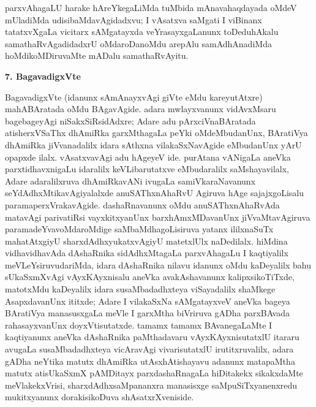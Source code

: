parxvAha\-gaLU harake hAreYkegaLiMda tuMbida mAnavahaqdayada oMdeV mUladiMda udisi\-baMdavAgidadxvu; I vAsatxva saMgati I viBinanx tatatxvXgaLa vicitarx sAMgatayxda veYrasayx\-gaLanunx toDeduhAkalu samathaRvAgadidadxrU oMdaroDanoMdu arepAlu samAdhAnadiMda hoMdikoMDiruvaMte mADalu samathaRvAyitu.

\smallskip
\begin{center}
{\Large\bf 7. BagavadigxVte}
\end{center}

BagavadigxVte (idanunx sAmAnayxvAgi giVte eMdu kareyutAtxre) mahABAratada oMdu BAgavAgide. adara mwlayxvanunx vidAvxMsaru bagebageyAgi niSakxSiRsidAdxre; Adare adu pArxciVnaBAratada atisherxVSaThx dhAmiRka garxMthagaLa peYki oMdeMbudanUnx, BAratiVya dhAmiRka jiVvanadalilx idara sAthxna vilakaSxNavAgide eMbudanUnx yArU opapxde ilalx. vAsatxvavAgi adu hAgeyeV ide. purAtana vANigaLa aneVka parxtidhavxni\-gaLu idaralilx keVLibarutatxve eMbudaralilx saMshayavilalx, Adare adaralilxruva dhAmiRka\-vANi ivugaLa samiVkaraNavanunx seYdAdhxMtikavAgiyalalxde anuSAThxnAhaRvU Agiruva hAge sajajxgoLisalu paramaperxVrakavAgide. dashaRnavanunx oMdu anuSAThxnAhaRvAda matavAgi parivatiRsi vayxkitxyanUnx barxhAmxMDavanUnx jiVvaMtavAgiruva paramadeYva\break\-voMdaroMdige saMbaMdhagoLisiruva yatanx ililxnaSuTx mahatAtxgiyU sharxdAdhxyukatx\-vAgiyU matetxlUlx naDedilalx. hiMdina vidhavidhavAda dAshaRnika sidAdhxMtagaLa parxvAhagaLu I kaqtiyalilx meVLeYsiruvudariMda, idara dAshaRnika nilavu idanunx oMdu kaDeyalilx bahu sUkaSxmXvAgi vAyxKAyxnisalu aneVka avakAshavanunx kalipxsikoTiTxde, matotxMdu kaDeyalilx idara susaMbadadhxteya viSayadalilx shaMkege AsapxdavanUnx ititxde; Adare I vilakaSxNa sAMgatayxveV aneVka bageya BAratiVya manasusxgaLa meVle I garxMtha biVriruva gADha parxBAvada rahasayxvanUnx doyxVtisutatxde. tamamx tamamx BAvanegaLaMte I kaqtiyanunx aneVka dAshaRnika paMthadavaru vAyxKAyxnisutatxlU itararu avugaLa susaMbadadhxteya vicAravAgi vivarisutatxlU irutitxruvalilx, adara gADha neYtika matutx dhAmiRka utAsxhAtishayavu adanunx matapaMtha matutx atisUkaSxmX pAMDitayx parxdashaRnagaLa hiDitakekx sikakxdaMte meVlakekxVrisi, sharxdAdhxsaMpananxra manasisxge saMpuSiTxyanenxredu mukitxyanunx dorakisikoDuva shAsatxrXveniside.

